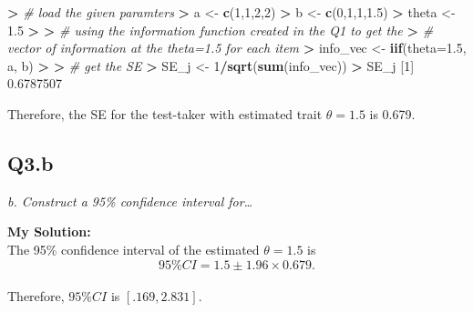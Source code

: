 \documentclass[
]{article}
\newenvironment{Shaded}{\begin{snugshade}}{\end{snugshade}}
\newcommand{\AttributeTok}[1]{\textcolor[rgb]{0.13,0.29,0.53}{#1}}
\newcommand{\CommentTok}[1]{\textcolor[rgb]{0.56,0.35,0.01}{\textit{#1}}}
\newcommand{\DecValTok}[1]{\textcolor[rgb]{0.00,0.00,0.81}{#1}}
\newcommand{\ErrorTok}[1]{\textcolor[rgb]{0.64,0.00,0.00}{\textbf{#1}}}
\newcommand{\FloatTok}[1]{\textcolor[rgb]{0.00,0.00,0.81}{#1}}
\newcommand{\FunctionTok}[1]{\textcolor[rgb]{0.13,0.29,0.53}{\textbf{#1}}}
\newcommand{\NormalTok}[1]{#1}
\newcommand{\OtherTok}[1]{\textcolor[rgb]{0.56,0.35,0.01}{#1}}
\newcommand{\SpecialCharTok}[1]{\textcolor[rgb]{0.81,0.36,0.00}{\textbf{#1}}}
\begin{document}
\begin{Shaded}
\begin{Highlighting}[]
\SpecialCharTok{\textgreater{}} \CommentTok{\# load the given paramters}
\ErrorTok{\textgreater{}}\NormalTok{ a }\OtherTok{\textless{}{-}} \FunctionTok{c}\NormalTok{(}\DecValTok{1}\NormalTok{,}\DecValTok{1}\NormalTok{,}\DecValTok{2}\NormalTok{,}\DecValTok{2}\NormalTok{)}
\SpecialCharTok{\textgreater{}}\NormalTok{ b }\OtherTok{\textless{}{-}} \FunctionTok{c}\NormalTok{(}\DecValTok{0}\NormalTok{,}\DecValTok{1}\NormalTok{,}\DecValTok{1}\NormalTok{,}\FloatTok{1.5}\NormalTok{)}
\SpecialCharTok{\textgreater{}}\NormalTok{ theta }\OtherTok{\textless{}{-}} \FloatTok{1.5}
\SpecialCharTok{\textgreater{}} 
\ErrorTok{\textgreater{}} \CommentTok{\# using the information function created in the Q1 to get the }
\ErrorTok{\textgreater{}} \CommentTok{\# vector of information at the theta=1.5 for each item}
\ErrorTok{\textgreater{}}\NormalTok{ info\_vec }\OtherTok{\textless{}{-}} \FunctionTok{iif}\NormalTok{(}\AttributeTok{theta=}\FloatTok{1.5}\NormalTok{, a, b)}
\SpecialCharTok{\textgreater{}} 
\ErrorTok{\textgreater{}} \CommentTok{\# get the SE}
\ErrorTok{\textgreater{}}\NormalTok{ SE\_j }\OtherTok{\textless{}{-}} \DecValTok{1}\SpecialCharTok{/}\FunctionTok{sqrt}\NormalTok{(}\FunctionTok{sum}\NormalTok{(info\_vec))}
\SpecialCharTok{\textgreater{}}\NormalTok{ SE\_j}
\NormalTok{[}\DecValTok{1}\NormalTok{] }\FloatTok{0.6787507}
\end{Highlighting}
\end{Shaded}

Therefore, the SE for the test-taker with estimated trait \(\theta=1.5\)
is 0.679.

\hypertarget{q3.b}{%
\subsection{Q3.b}\label{q3.b}}

\emph{b. Construct a 95\% confidence interval for\ldots{}}

\textbf{My Solution:}\\
The 95\% confidence interval of the estimated \(\theta=1.5\) is
\[95\%CI = 1.5\pm 1.96\times 0.679.\]\\
Therefore, \(95\%CI\) is \([.169, 2.831].\)
\end{document}
